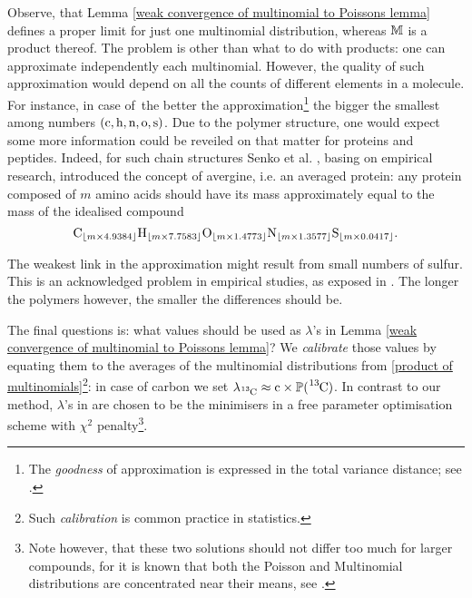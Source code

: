 Observe, that Lemma \ref{weak convergence of multinomial to Poissons lemma} defines a proper limit for just one multinomial distribution, whereas $\mathbb{M}$ is a product thereof. The problem is other than what to do with products: one can approximate independently each multinomial. However, the quality of such approximation would depend on all the counts of different elements in a molecule. For instance, in case of \molecule\,the better the approximation\footnote{The {\it goodness} of approximation is expressed in the total variance distance; see \cite{Roos1999OnTheRateOfMultivariatePoissonConvergence}.} the bigger the smallest among numbers $(\cem{c}, \cem{h}, \cem{n}, \cem{o}, \cem{s})$. Due to the polymer structure, one would expect some more information could be reveiled on that matter for proteins and peptides. Indeed, for such chain structures Senko et al. \cite{Senko1995Determination}, basing on empirical research, introduced the concept of avergine, i.e. an averaged protein: any protein composed of $m$ amino acids should have its mass approximately equal to the mass of the idealised compound 
\begin{equation*}
	\cem{C}_{\lfloor m \times 4.9384\rfloor} 
	\cem{H}_{\lfloor m \times 7.7583\rfloor} 
	\cem{O}_{\lfloor m \times 1.4773\rfloor} 	
	\cem{N}_{\lfloor m \times 1.3577\rfloor} 
	\cem{S}_{\lfloor m \times 0.0417\rfloor}.
\end{equation*}

The weakest link in the approximation might result from small numbers of sulfur. This is an acknowledged problem in empirical studies, as exposed in \cite{Valkenborg2007UsingPoisson}. The longer the polymers however, the smaller the differences should be. 


The final questions is: what values should be used as $\lambda$'s in Lemma \ref{weak convergence of multinomial to Poissons lemma}? We {\it calibrate} those values by equating them to the averages of the multinomial distributions from \eqref{product of multinomials}\footnote{Such {\it calibration} is common practice in statistics.}: in case of carbon we set $\lambda_\cem{^{13}C} \approx \cem{c} \times \prob( \cem{^{13}C} )$.  In contrast to our method, $\lambda$'s in \cite{Breen2000AutomaticPeak,Valkenborg2007UsingPoisson} are chosen to be the minimisers in a free parameter optimisation scheme with $\chi^2$ penalty\footnote{Note however, that these two solutions should not differ too much for larger compounds, for it is known that both the Poisson and Multinomial distributions are concentrated near their means, see \cite{Bobkov1998OnModifiedLogarithmicSobolev}.}. 


